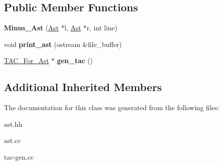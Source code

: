 \subsection*{Public Member Functions}
\begin{DoxyCompactItemize}
\item 
\mbox{\label{classMinus__Ast_a98ed432fcc1361417e3c27b88fc87abc}} 
{\bfseries Minus\+\_\+\+Ast} (\hyperlink{classAst}{Ast} $\ast$l, \hyperlink{classAst}{Ast} $\ast$r, int line)
\item 
\mbox{\label{classMinus__Ast_acda7998d88ecbf15f0efe38ff2258386}} 
void {\bfseries print\+\_\+ast} (ostream \&file\+\_\+buffer)
\item 
\mbox{\label{classMinus__Ast_ad3f07ab3bd23eafd8b3427100ad15c29}} 
\hyperlink{classTAC__For__Ast}{T\+A\+C\+\_\+\+For\+\_\+\+Ast} $\ast$ {\bfseries gen\+\_\+tac} ()
\end{DoxyCompactItemize}
\subsection*{Additional Inherited Members}


The documentation for this class was generated from the following files\+:\begin{DoxyCompactItemize}
\item 
ast.\+hh\item 
ast.\+cc\item 
tac-\/gen.\+cc\end{DoxyCompactItemize}
